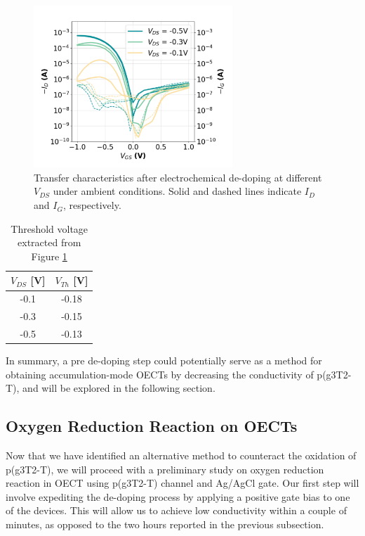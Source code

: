 \begin{figure}[ht]
    \centering
    \includegraphics[width=7.5cm]{Images/pdf/revox_transfer_loop2.pdf}%
    \caption[Transfer characteristics after electrochemical de-doping]{Transfer characteristics after electrochemical de-doping at different $V_{DS}$ under ambient conditions. Solid and dashed lines indicate $I_{D}$ and $I_{G}$, respectively.}
    \label{fig:transrevox1}
\end{figure}

\begin{table}[ht]
\centering
\caption{Threshold voltage extracted from Figure \ref{fig:transrevox1}}
\begin{tabular}{c|c}
 $V_{DS}$ [V] & $V_{Th}$ [V] \\\hline
-0.1 & -0.18 \\
-0.3 & -0.15 \\
-0.5 & -0.13 \\ \hline
\end{tabular}
\label{tab:vth_air}
\end{table}

In summary, a pre de-doping step could potentially serve as a method for obtaining accumulation-mode OECTs by decreasing the conductivity of p(g3T2-T), and will be explored in the following section.

\subsection{Oxygen Reduction Reaction on OECTs} \label{subsec:revox}
Now that we have identified an alternative method to counteract the oxidation of p(g3T2-T), we will proceed with a preliminary study on oxygen reduction reaction in OECT using p(g3T2-T) channel and Ag/AgCl gate. Our first step will involve expediting the de-doping process by applying a positive gate bias to one of the devices. This will allow us to achieve low conductivity within a couple of minutes, as opposed to the two hours reported in the previous subsection. 


